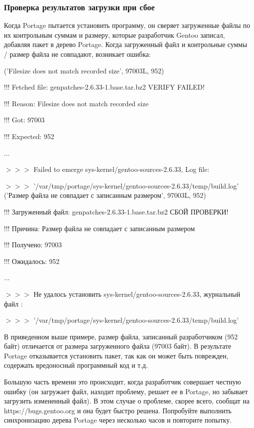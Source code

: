 \documentclass[10pt]{book}
\begin{document}
\subsubsection{Проверка результатов загрузки при сбое}
Когда Portage пытается установить программу, он сверяет загруженные файлы по их контрольным суммам и размеру, которые разработчик Gentoo записал, добавляя пакет в дерево Portage. Когда загруженный файл и  контрольные суммы / размер файла не совпадают, возникает ошибка:
 \begin{tcolorbox}
('Filesize does not match recorded size', 97003L, 952)

!!! Fetched file: genpatches-2.6.33-1.base.tar.bz2 VERIFY FAILED!

!!! Reason: Filesize does not match recorded size

!!! Got: 97003

!!! Expected: 952

...

$>>>$ Failed to emerge sys-kernel/gentoo-sources-2.6.33, Log file:

$>>>$ '/var/tmp/portage/sys-kernel/gentoo-sources-2.6.33/temp/build.log' \\

('Размер файла не совпадает с записанным размером', 97003L, 952)

!!! Загруженный файл: genpatches-2.6.33-1.base.tar.bz2 СБОЙ ПРОВЕРКИ!

!!! Причина: Размер файла не совпадает с записанным размером

!!! Получено: 97003

!!! Ожидалось: 952

...

$>>>$ Не удалось установить sys-kernel/gentoo-sources-2.6.33, журнальный файл :

$>>>$ '/var/tmp/portage/sys-kernel/gentoo-sources-2.6.33/temp/build.log' 
 \end{tcolorbox}
В приведенном выше примере, размер файла, записанный разработчиком (952 байт) отличается от размера загруженного файла (97003 байт). В результате Portage отказывается установить пакет, так как он может быть поврежден, содержать вредоносный программный код и т.д. 

Большую часть времени это происходит, когда разработчик совершает честную ошибку (он загружает файл, находит проблему, решает ее в Portage, но забывает загрузить измененный файл). В этом случае о проблеме, скорее всего, сообщат на https://bugs.gentoo.org и она будет быстро решена. Попробуйте выполнить синхронизацию дерева Portage через несколько часов и повторите попытку.
\end{document}

